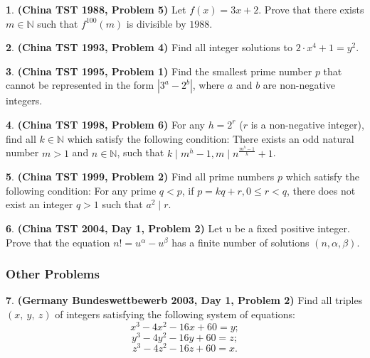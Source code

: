 \documentclass{article}
\theoremstyle{definition}
\newtheorem{p}{}
\begin{document}
\begin{p}{\bf (China TST 1988, Problem 5)}
Let $f(x) = 3x + 2.$ Prove that there exists $m \in \mathbb{N}$ such that $f^{100}(m)$ is divisible by $1988$.
\end{p}




\begin{p}{\bf (China TST 1993, Problem 4)}
Find all integer solutions to $2 \cdot x^4 + 1 = y^2.$
\end{p}


\begin{p}{\bf (China TST 1995, Problem 1)}
Find the smallest prime number $p$ that cannot be represented in the form $|3^{a} - 2^{b}|$, where $a$ and $b$ are non-negative integers.
\end{p}



\begin{p}{\bf (China TST 1998, Problem 6)}
For any $h = 2^{r}$ ($r$ is a non-negative integer), find all $k \in \mathbb{N}$ which satisfy the following condition: There exists an odd natural number $m > 1$ and $n \in \mathbb{N}$, such that $k \mid m^{h} - 1, m \mid n^{\frac{m^{h}-1}{k}} + 1$.
\end{p}



\begin{p}{\bf (China TST 1999, Problem 2)}
Find all prime numbers $p$ which satisfy the following condition: For any prime $q < p$, if $p = kq + r, 0 \leq r < q$, there does not exist an integer $q > 1$ such that $a^{2} \mid r$.
\end{p}





\begin{p}{\bf (China TST 2004, Day 1, Problem 2)}
Let u be a fixed positive integer. Prove that the equation $n! = u^{\alpha} - u^{\beta}$ has a finite number of solutions $(n, \alpha, \beta).$
\end{p}



\subsubsection{Other Problems}


\begin{p}{\bf (Germany Bundeswettbewerb 2003, Day 1, Problem 2)}
Find all triples $\left(x,\ y,\ z\right)$ of integers satisfying the following system of equations:
\[x^3-4x^2-16x+60=y;\]\[y^3-4y^2-16y+60=z;\]\[z^3-4z^2-16z+60=x.\]
\end{p}
\end{document}
